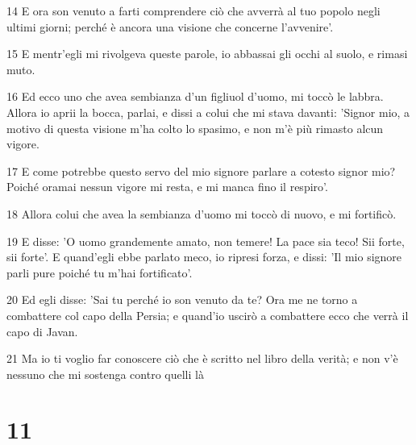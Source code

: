 \par 14 E ora son venuto a farti comprendere ciò che avverrà al tuo popolo negli ultimi giorni; perché è ancora una visione che concerne l'avvenire'.
\par 15 E mentr'egli mi rivolgeva queste parole, io abbassai gli occhi al suolo, e rimasi muto.
\par 16 Ed ecco uno che avea sembianza d'un figliuol d'uomo, mi toccò le labbra. Allora io aprii la bocca, parlai, e dissi a colui che mi stava davanti: 'Signor mio, a motivo di questa visione m'ha colto lo spasimo, e non m'è più rimasto alcun vigore.
\par 17 E come potrebbe questo servo del mio signore parlare a cotesto signor mio? Poiché oramai nessun vigore mi resta, e mi manca fino il respiro'.
\par 18 Allora colui che avea la sembianza d'uomo mi toccò di nuovo, e mi fortificò.
\par 19 E disse: 'O uomo grandemente amato, non temere! La pace sia teco! Sii forte, sii forte'. E quand'egli ebbe parlato meco, io ripresi forza, e dissi: 'Il mio signore parli pure poiché tu m'hai fortificato'.
\par 20 Ed egli disse: 'Sai tu perché io son venuto da te? Ora me ne torno a combattere col capo della Persia; e quand'io uscirò a combattere ecco che verrà il capo di Javan.
\par 21 Ma io ti voglio far conoscere ciò che è scritto nel libro della verità; e non v'è nessuno che mi sostenga contro quelli là

\chapter{11}

